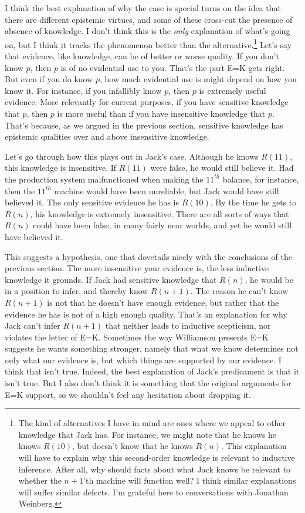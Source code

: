 I think the best explanation of why the case is special turns on the idea that there are different epistemic virtues, and some of these cross-cut the presence of absence of knowledge. I don't think this is the \textit{only} explanation of what's going on, but I think it tracks the phenomenon better than the alternative.\footnote{The kind of alternatives I have in mind are ones where we appeal to other knowledge that Jack has. For instance, we might note that he knows he knows \(R(10)\), but doesn't know that he knows \(R(n)\). This explanation will have to explain why this second-order knowledge is relevant to inductive inference. After all, why should facts about what Jack knows be relevant to whether the \(n+1\)'th machine will function well? I think similar explanations will suffer similar defects. I'm grateful here to conversations with Jonathan Weinberg.} Let's say that evidence, like knowledge, can be of better or worse quality. If you don't know \(p\), then \(p\) is of no evidential use to you. That's the part E=K gets right. But even if you do know \(p\), how much evidential use is might depend on how you know it. For instance, if you infallibly know \(p\), then \(p\) is extremely useful evidence. More relevantly for current purposes, if you have sensitive knowledge that \(p\), then \(p\) is more useful than if you have insensitive knowledge that \(p\). That's because, as we argued in the previous section, sensitive knowledge has epistemic qualities over and above insensitive knowledge.

Let's go through how this plays out in Jack's case. Although he knows \(R(11)\), this knowledge is insensitive. If \(R(11)\) were false, he would still believe it. Had the production system malfunctioned when making the \(11^{th}\) balance, for instance, then the \(11^{th}\) machine would have been unreliable, but Jack would have still believed it. The only sensitive evidence he has is \(R(10)\). By the time he gets to \(R(n)\), his knowledge is extremely insensitive. There are all sorts of ways that \(R(n)\) could have been false, in many fairly near worlds, and yet he would still have believed it.

This suggests a hypothesis, one that dovetails nicely with the conclusions of the previous section. The more insensitive your evidence is, the less inductive knowledge it grounds. If Jack had sensitive knowledge that \(R(n)\), he would be in a position to infer, and thereby know \(R(n+1)\). The reason he can't know \(R(n+1)\) is not that he doesn't have enough evidence, but rather that the evidence he has is not of a high enough quality. That's an explanation for why Jack can't infer \(R(n+1)\) that neither leads to inductive scepticism, nor violates the letter of E=K. Sometimes the way Williamson presents E=K suggests he wants something stronger, namely that what we know determines not only what our evidence is, but which things are supported by our evidence. I think that isn't true. Indeed, the best explanation of Jack's predicament is that it isn't true. But I also don't think it is something that the original arguments for E=K support, so we shouldn't feel any hesitation about dropping it.
